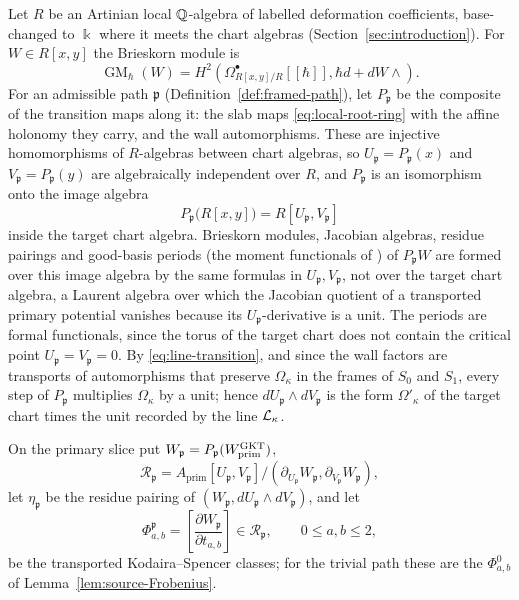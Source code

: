 Let $R$ be an Artinian local $\mathbb Q$-algebra of labelled deformation
coefficients, base-changed to $\Bbbk$ where it meets the chart algebras
(Section~\ref{sec:introduction}).  For $W\in R[x,y]$ the Brieskorn module is
\begin{equation}\label{eq:Brieskorn-module}
 \operatorname{GM}_\hbar(W)
 =H^2\!\left(
  \Omega_{R[x,y]/R}^{\bullet}[[\hbar]],
  \hbar d+dW\wedge
 \right).
\end{equation}
For an admissible path $\mathfrak p$ (Definition~\ref{def:framed-path}), let
$P_{\mathfrak p}$ be the composite of the transition maps along it: the slab
maps \eqref{eq:local-root-ring} with the affine holonomy they carry, and the
wall automorphisms.  These are injective homomorphisms of $R$-algebras
between chart algebras, so $U_{\mathfrak p}=P_{\mathfrak p}(x)$ and
$V_{\mathfrak p}=P_{\mathfrak p}(y)$ are algebraically independent over $R$,
and $P_{\mathfrak p}$ is an isomorphism onto the image algebra
\begin{equation}\label{eq:image-algebra}
 P_{\mathfrak p}\bigl(R[x,y]\bigr)=R[U_{\mathfrak p},V_{\mathfrak p}]
\end{equation}
inside the target chart algebra.  Brieskorn modules, Jacobian algebras,
residue pairings and good-basis periods (the moment functionals of
\cite[Lem.~4.2]{grossetal2022open}) of $P_{\mathfrak p}W$ are formed over
this image algebra by the same formulas in $U_{\mathfrak p},V_{\mathfrak p}$,
not over the target chart algebra, a Laurent algebra over which the Jacobian
quotient of a transported primary potential vanishes because its
$U_{\mathfrak p}$-derivative is a unit.  The periods are
formal functionals, since the torus of the target chart does not contain the
critical point $U_{\mathfrak p}=V_{\mathfrak p}=0$.  By
\eqref{eq:line-transition}, and since the wall factors are transports of
automorphisms that preserve $\Omega_\kappa$ in the frames of $S_0$ and $S_1$,
every step of $P_{\mathfrak p}$ multiplies $\Omega_\kappa$ by a unit; hence
$dU_{\mathfrak p}\wedge dV_{\mathfrak p}$ is the form
$\Omega'_\kappa$ of the target chart times the unit recorded by the line
$\mathcal L_\kappa$.

On the primary slice put
$W_{\mathfrak p}=P_{\mathfrak p}(W^{\mathrm{GKT}}_{\mathrm{prim}})$,
\begin{equation}\label{eq:transported-primary-Jacobian}
 \mathcal R_{\mathfrak p}
 =A_{\mathrm{prim}}[U_{\mathfrak p},V_{\mathfrak p}]\big/
  (\partial_{U_{\mathfrak p}}W_{\mathfrak p},
   \partial_{V_{\mathfrak p}}W_{\mathfrak p}),
\end{equation}
let $\eta_{\mathfrak p}$ be the residue pairing of
$(W_{\mathfrak p},dU_{\mathfrak p}\wedge dV_{\mathfrak p})$, and let
\begin{equation}\label{eq:KS-sections}
 \Phi_{a,b}^{\mathfrak p}
 =\left[\frac{\partial W_{\mathfrak p}}{\partial t_{a,b}}\right]
 \in\mathcal R_{\mathfrak p},
 \qquad 0\leq a,b\leq2,
\end{equation}
be the transported Kodaira--Spencer classes; for the trivial path these are
the $\Phi^0_{a,b}$ of Lemma~\ref{lem:source-Frobenius}.

